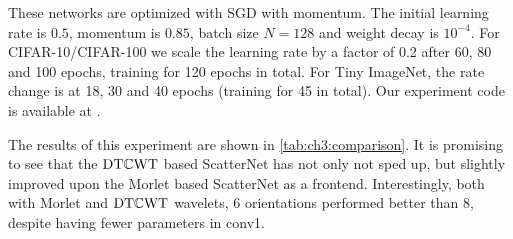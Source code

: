 These networks are optimized with SGD with momentum. The
initial learning rate is $0.5$, momentum is $0.85$, batch size $N=128$ and
weight decay is $10^{-4}$. For CIFAR-10/CIFAR-100 we scale the learning rate by
a factor of 0.2 after 60, 80 and 100 epochs, training for 120 epochs in total.
For Tiny ImageNet, the rate change is at 18, 30 and 40 epochs (training for 45 in total).
Our experiment code is available at \cite{cotter_learnable_2019-1}.

The results of this
experiment are shown in \autoref{tab:ch3:comparison}. It is promising to see
that the $\mathrm{DT}\mathbb{C}\mathrm{WT}$ based ScatterNet has not only not sped up, but slightly improved
upon the Morlet based ScatterNet as a frontend. Interestingly, both with Morlet
and $\mathrm{DT}\mathbb{C}\mathrm{WT}$ wavelets, 6 orientations performed better than 8, despite having
fewer parameters in conv1.
